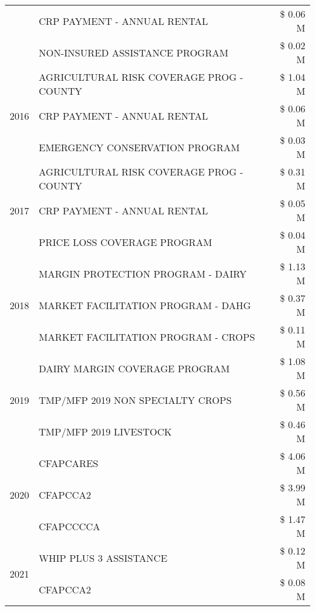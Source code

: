 \begin{tabular}{llr}
 & CRP PAYMENT - ANNUAL RENTAL & \$ 0.06 M \\
 & NON-INSURED ASSISTANCE PROGRAM & \$ 0.02 M \\
\cline{1-3}
\multirow[t]{3}{*}{2016} & AGRICULTURAL RISK COVERAGE PROG - COUNTY & \$ 1.04 M \\
 & CRP PAYMENT - ANNUAL RENTAL & \$ 0.06 M \\
 & EMERGENCY CONSERVATION PROGRAM & \$ 0.03 M \\
\cline{1-3}
\multirow[t]{3}{*}{2017} & AGRICULTURAL RISK COVERAGE PROG - COUNTY & \$ 0.31 M \\
 & CRP PAYMENT - ANNUAL RENTAL & \$ 0.05 M \\
 & PRICE LOSS COVERAGE PROGRAM & \$ 0.04 M \\
\cline{1-3}
\multirow[t]{3}{*}{2018} & MARGIN PROTECTION PROGRAM - DAIRY & \$ 1.13 M \\
 & MARKET FACILITATION PROGRAM - DAHG & \$ 0.37 M \\
 & MARKET FACILITATION PROGRAM - CROPS & \$ 0.11 M \\
\cline{1-3}
\multirow[t]{3}{*}{2019} & DAIRY MARGIN COVERAGE PROGRAM & \$ 1.08 M \\
 & TMP/MFP 2019 NON SPECIALTY CROPS & \$ 0.56 M \\
 & TMP/MFP 2019 LIVESTOCK & \$ 0.46 M \\
\cline{1-3}
\multirow[t]{3}{*}{2020} & CFAPCARES & \$ 4.06 M \\
 & CFAPCCA2 & \$ 3.99 M \\
 & CFAPCCCCA & \$ 1.47 M \\
\cline{1-3}
\multirow[t]{2}{*}{2021} & WHIP PLUS 3 ASSISTANCE & \$ 0.12 M \\
 & CFAPCCA2 & \$ 0.08 M \\
\cline{1-3}
\bottomrule
\end{tabular}
